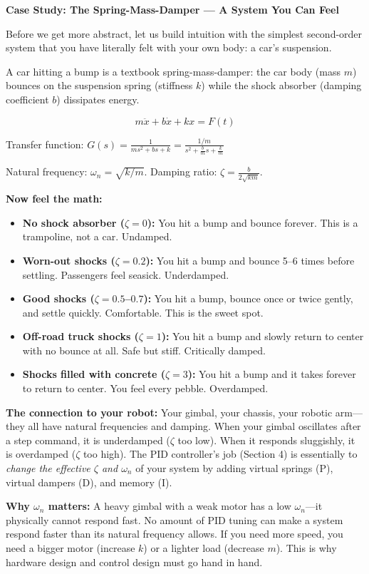 \vspace{0.5em}
\begin{mdframed}[linewidth=1pt, innertopmargin=10pt, innerbottommargin=10pt]
\textbf{Case Study: The Spring-Mass-Damper --- A System You Can Feel}

\vspace{0.3em}
Before we get more abstract, let us build intuition with the simplest second-order system that you have literally felt with your own body: a car's suspension.

A car hitting a bump is a textbook spring-mass-damper: the car body (mass $m$) bounces on the suspension spring (stiffness $k$) while the shock absorber (damping coefficient $b$) dissipates energy.

\[
m\ddot{x} + b\dot{x} + kx = F(t)
\]

Transfer function: $G(s) = \frac{1}{ms^2 + bs + k} = \frac{1/m}{s^2 + \frac{b}{m}s + \frac{k}{m}}$

Natural frequency: $\omega_n = \sqrt{k/m}$. \quad Damping ratio: $\zeta = \frac{b}{2\sqrt{km}}$.

\textbf{Now feel the math:}
\begin{itemize}[nosep]
    \item \textbf{No shock absorber ($\zeta = 0$):} You hit a bump and bounce forever. This is a trampoline, not a car. Undamped.
    \item \textbf{Worn-out shocks ($\zeta = 0.2$):} You hit a bump and bounce 5--6 times before settling. Passengers feel seasick. Underdamped.
    \item \textbf{Good shocks ($\zeta = 0.5$--$0.7$):} You hit a bump, bounce once or twice gently, and settle quickly. Comfortable. This is the sweet spot.
    \item \textbf{Off-road truck shocks ($\zeta = 1$):} You hit a bump and slowly return to center with no bounce at all. Safe but stiff. Critically damped.
    \item \textbf{Shocks filled with concrete ($\zeta = 3$):} You hit a bump and it takes forever to return to center. You feel every pebble. Overdamped.
\end{itemize}

\textbf{The connection to your robot:} Your gimbal, your chassis, your robotic arm---they all have natural frequencies and damping. When your gimbal oscillates after a step command, it is underdamped ($\zeta$ too low). When it responds sluggishly, it is overdamped ($\zeta$ too high). The PID controller's job (Section 4) is essentially to \textit{change the effective $\zeta$ and $\omega_n$} of your system by adding virtual springs (P), virtual dampers (D), and memory (I).

\textbf{Why $\omega_n$ matters:} A heavy gimbal with a weak motor has a low $\omega_n$---it physically cannot respond fast. No amount of PID tuning can make a system respond faster than its natural frequency allows. If you need more speed, you need a bigger motor (increase $k$) or a lighter load (decrease $m$). This is why hardware design and control design must go hand in hand.
\end{mdframed}

